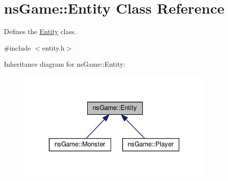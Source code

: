 \hypertarget{structns_game_1_1_entity}{}\section{ns\+Game\+:\+:Entity Class Reference}
\label{structns_game_1_1_entity}


Defines the \hyperlink{structns_game_1_1_entity}{Entity} class.  




{\ttfamily \#include $<$entity.\+h$>$}



Inheritance diagram for ns\+Game\+:\+:Entity\+:\nopagebreak
\begin{figure}[H]
\begin{center}
\leavevmode
\includegraphics[width=280pt]{structns_game_1_1_entity__inherit__graph}
\end{center}
\end{figure}
